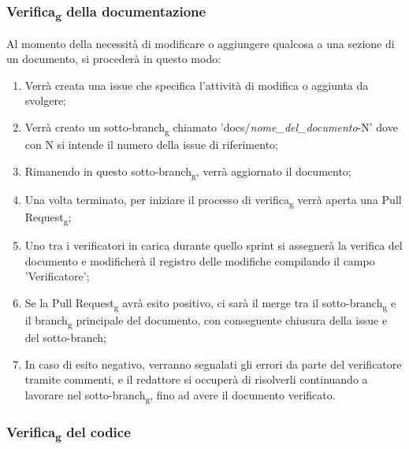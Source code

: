         \subsubsection{Verifica\textsubscript{g} della documentazione}
        Al momento della necessità di modificare o aggiungere qualcosa a una sezione di un documento, si procederà in questo modo:
        \begin{enumerate}
            \item Verrà creata una issue che specifica l'attività di modifica o aggiunta da svolgere;
            \item Verrà creato un sotto-branch\textsubscript{g} chiamato 'docs/\textit{nome\_del\_documento}-N' dove con N si intende il numero della issue di riferimento;
            \item Rimanendo in questo sotto-branch\textsubscript{g}, verrà aggiornato il documento;
            \item Una volta terminato, per iniziare il processo di verifica\textsubscript{g} verrà aperta una Pull Request\textsubscript{g};
            \item Uno tra i verificatori in carica durante quello sprint si assegnerà la verifica del documento e modificherà il registro delle modifiche compilando il campo 'Verificatore';
            \item Se la Pull Request\textsubscript{g} avrà esito positivo, ci sarà il merge tra il sotto-branch\textsubscript{g} e il branch\textsubscript{g} principale del documento, con conseguente chiusura della issue e del sotto-branch;
            \item In caso di esito negativo, verranno segnalati gli errori da parte del verificatore tramite commenti, e il redattore si occuperà di risolverli continuando a lavorare nel sotto-branch\textsubscript{g}, fino ad avere il documento verificato.
        \end{enumerate}

        \subsubsection{Verifica\textsubscript{g} del codice}

